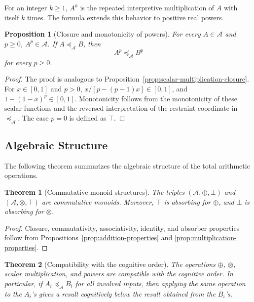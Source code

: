 \documentclass[reqno,final]{amsart}
\theoremstyle{definition}
\theoremstyle{plain}
\newtheorem{proposition}{Proposition}
\newtheorem{theorem}{Theorem}
\theoremstyle{remark}
\providecommand{\cA}{\mathcal{A}}
\providecommand{\preceqA}{\preceq_{\mathcal A}}
\begin{document}
For an integer \(k\ge1\), \(A^k\) is the repeated interpretive multiplication of \(A\) with itself \(k\) times. The formula extends this behavior to positive real powers.

\begin{proposition}[Closure and monotonicity of powers]
\label{prop:powers-closure}
For every \(A\in\cA\) and \(p\ge0\), \(A^p\in\cA\). If \(A\preceqA B\), then
\[
A^p\preceqA B^p
\]
for every \(p\ge0\).
\end{proposition}

\begin{proof}
The proof is analogous to Proposition~\ref{prop:scalar-multiplication-closure}. For \(x\in[0,1]\) and \(p>0\), \(x/[p-(p-1)x]\in[0,1]\), and \(1-(1-x)^p\in[0,1]\). Monotonicity follows from the monotonicity of these scalar functions and the reversed interpretation of the restraint coordinate in \(\preceqA\). The case \(p=0\) is defined as \(\top\).
\end{proof}

\subsection{Algebraic Structure}
\label{subsec:algebraic-properties}

The following theorem summarizes the algebraic structure of the total arithmetic operations.

\begin{theorem}[Commutative monoid structures]
\label{thm:commutative-monoids}
The triples \((\cA,\oplus,\bot)\) and \((\cA,\otimes,\top)\) are commutative monoids. Moreover, \(\top\) is absorbing for \(\oplus\), and \(\bot\) is absorbing for \(\otimes\).
\end{theorem}

\begin{proof}
Closure, commutativity, associativity, identity, and absorber properties follow from Propositions~\ref{prop:addition-properties} and \ref{prop:multiplication-properties}.
\end{proof}

\begin{theorem}[Compatibility with the cognitive order]
\label{thm:arithmetic-order-compatibility}
The operations \(\oplus\), \(\otimes\), scalar multiplication, and powers are compatible with the cognitive order. In particular, if \(A_i\preceqA B_i\) for all involved inputs, then applying the same operation to the \(A_i\)'s gives a result cognitively below the result obtained from the \(B_i\)'s.
\end{theorem}
\end{document}
